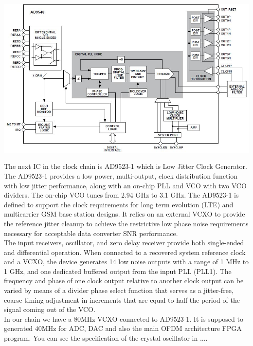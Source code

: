 \begin{center}
\includegraphics[width=15cm]{content/fig/ad9548BlockDiagram.JPG}
\end{center}

The next IC in the clock chain is AD9523-1 which is Low Jitter Clock Generator. The AD9523-1 provides a low power, multi-output, clock distribution function with low jitter performance, along with an on-chip PLL and VCO with two VCO dividers. The on-chip VCO tunes from 2.94 GHz to 3.1 GHz. The AD9523-1 is defined to support the clock requirements for
long term evolution (LTE) and multicarrier GSM base station designs. It relies on an external VCXO to provide the reference
jitter cleanup to achieve the restrictive low phase noise requirements necessary for acceptable data converter SNR performance.\\
The input receivers, oscillator, and zero delay receiver provide both single-ended and differential operation. When connected to a recovered system reference clock and a VCXO, the device generates 14 low noise outputs with a range of 1 MHz to 1 GHz, and one dedicated buffered output from the input PLL (PLL1). The frequency and phase of one clock output relative to another clock output can be varied by means of a divider phase select function that serves as a jitter-free, coarse timing adjustment in increments that are equal to half the period of the signal coming out of the VCO.\\
In  our chain we have a 80MHz VCXO connected to AD9523-1. It is supposed to generated 40MHz for ADC, DAC and also the main OFDM architecture FPGA program. You can see the specification of the crystal oscillator in ....\\

